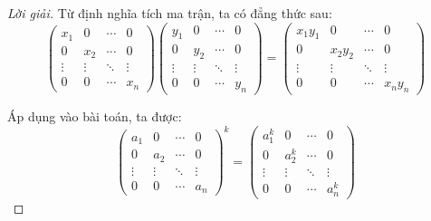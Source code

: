 \documentclass[class=linearalgebra,crop=false]{standalone}
\begin{document}
\begin{proof}[Lời giải]
    Từ định nghĩa tích ma trận, ta có đẳng thức sau:
    \[
        \begin{pmatrix}
            x_{1}  & 0      & \cdots & 0      \\
            0      & x_{2}  & \cdots & 0      \\
            \vdots & \vdots & \ddots & \vdots \\
            0      & 0      & \cdots & x_{n}
        \end{pmatrix}
        \begin{pmatrix}
            y_{1}  & 0      & \cdots & 0      \\
            0      & y_{2}  & \cdots & 0      \\
            \vdots & \vdots & \ddots & \vdots \\
            0      & 0      & \cdots & y_{n}
        \end{pmatrix}
        =
        \begin{pmatrix}
            x_{1}y_{1} & 0          & \cdots & 0          \\
            0          & x_{2}y_{2} & \cdots & 0          \\
            \vdots     & \vdots     & \ddots & \vdots     \\
            0          & 0          & \cdots & x_{n}y_{n}
        \end{pmatrix}
    \]
    \par Áp dụng vào bài toán, ta được:
    \[
        \begin{pmatrix}
            a_{1}  & 0      & \cdots & 0      \\
            0      & a_{2}  & \cdots & 0      \\
            \vdots & \vdots & \ddots & \vdots \\
            0      & 0      & \cdots & a_{n}
        \end{pmatrix}^{k}
        =
        \begin{pmatrix}
            a^{k}_{1} & 0         & \cdots & 0         \\
            0         & a^{k}_{2} & \cdots & 0         \\
            \vdots    & \vdots    & \ddots & \vdots    \\
            0         & 0         & \cdots & a^{k}_{n}
        \end{pmatrix}
    \]
\end{proof}
\end{document}
